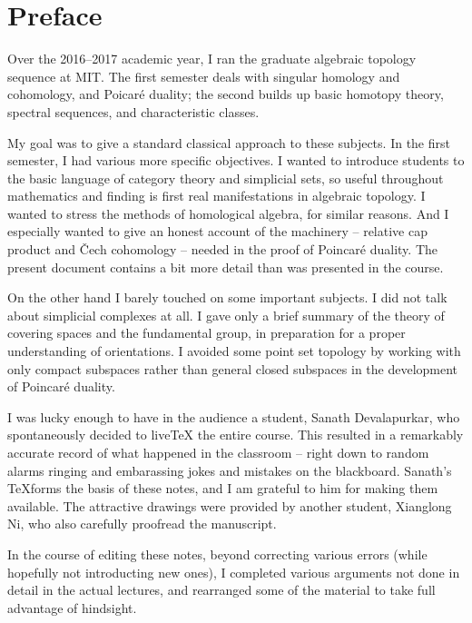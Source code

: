 \cleardoublepage
\section*{Preface}
Over the 2016--2017 academic year, I ran the graduate algebraic topology 
sequence at MIT. The first semester deals with singular homology and 
cohomology, and Poicar\'e duality; the second builds up basic homotopy theory,
spectral sequences, and characteristic classes. 

My goal was to give a standard classical approach to these subjects. 
In the first semester, I had various more specific objectives. 
I wanted to introduce students to the basic language of category theory
and simplicial sets, so useful throughout
mathematics and finding is first real manifestations in algebraic 
topology. I wanted to stress the methods of homological algebra,
for similar reasons. And I especially wanted 
to give an honest account of the machinery -- relative cap product and
\v{C}ech cohomology --  needed in the proof of Poincar\'e duality. 
The present document contains a bit more detail than was presented 
in the course.

On the other hand I barely touched on some important subjects. 
I did not talk about simplicial complexes at all.
I gave only a brief summary of
the theory of covering spaces and the fundamental group, in preparation
for a proper understanding of orientations. I avoided some point set
topology by working with only compact subspaces rather than general closed 
subspaces in the development of Poincar\'e duality.

I was lucky enough to have in the audience a student, Sanath Devalapurkar, 
who spontaneously decided to {live\TeX} the entire course. This resulted in 
a remarkably accurate record of what happened in the classroom -- right down
to random alarms ringing and embarassing jokes and mistakes on the blackboard. 
Sanath's \TeX forms the basis of these notes, and I am grateful to him 
for making them available. The attractive  drawings were provided by
another student, Xianglong Ni, who also carefully proofread the manuscript.

In the course of editing these notes, beyond correcting various errors 
(while hopefully not introducting new ones), I completed various arguments
not done in detail in the actual lectures, and rearranged some of the
material to take full advantage of hindsight. 




\newpage


